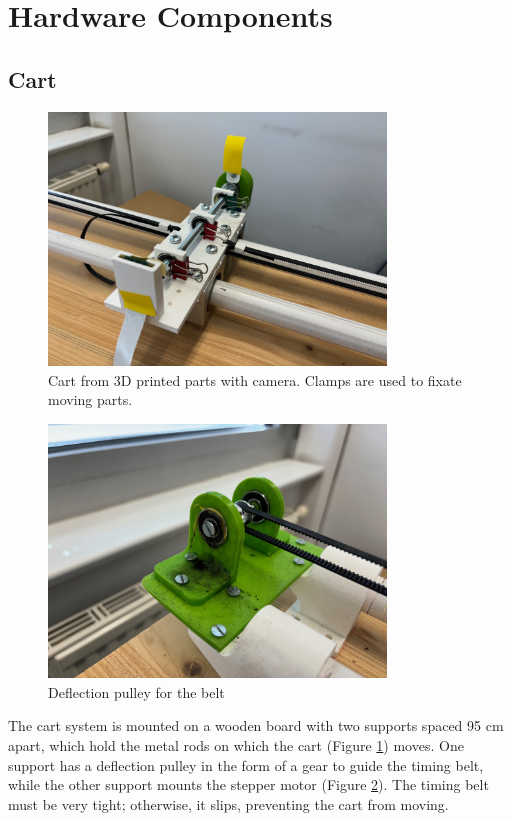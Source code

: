 \section{Hardware Components}
\subsection{Cart}
\begin{figure}[htbp]
    \centering
    \includegraphics[width=0.8\textwidth]{img/cart.jpg}
    \caption{Cart from 3D printed parts with camera. Clamps are used to fixate moving parts.}
    \label{fig:cart}
\end{figure}
\begin{figure}[htbp]
    \centering
    \includegraphics[width=0.8\textwidth]{img/deflection_pulley.jpg}
    \caption{Deflection pulley for the belt}
    \label{fig:deflection_pulley}
\end{figure}

The cart system is mounted on a wooden board with two supports spaced 95 cm apart, which hold the metal rods on which the cart (Figure \ref{fig:cart}) moves. One support has a deflection pulley in the form of a gear to guide the timing belt, while the other support mounts the stepper motor (Figure \ref{fig:deflection_pulley}). The timing belt must be very tight; otherwise, it slips, preventing the cart from moving.

